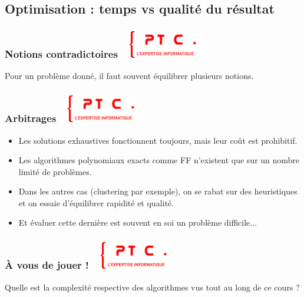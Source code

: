 \documentclass[11pt]{beamer}
\newenvironment{slide}[1]{%
\begin{frame}[environment=slide]
\frametitle{#1~\hfill~\includegraphics[height=1.2cm]{./epitech.png}}
}{%
\end{frame}
}
\begin{document}
\subsection{Optimisation : temps vs qualité du résultat}

\begin{slide}{Notions contradictoires}

Pour un problème donné, il faut souvent équilibrer plusieurs notions.

\begin{center}
\end{center}
\end{slide}

\begin{slide}{Arbitrages}

\begin{itemize}
\item Les solutions exhaustives fonctionnent toujours, mais leur coût est prohibitif.
\pause
\item Les algorithmes polynomiaux exacts comme FF n'existent que sur un nombre limité de problèmes.
\pause
\item Dans les autres cas (clustering par exemple), on se rabat sur des heuristiques et on essaie d'équilibrer rapidité et qualité.
\pause
\item Et évaluer cette dernière est souvent en soi un problème difficile...

\end{itemize}

\end{slide}

\begin{slide}{{\`A} vous de jouer !}

Quelle est la complexité respective des algorithmes vus tout au long de ce cours ?

\end{slide}
\end{document}
